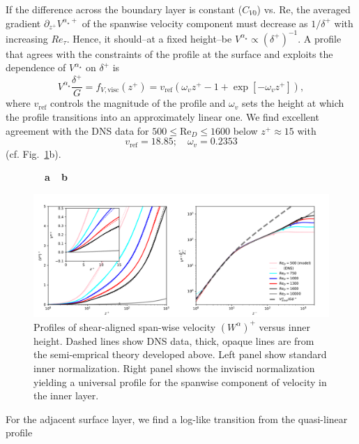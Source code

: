 \documentclass[smallcondensed,final]{svjour3}
\newcommand{\RE}{\mathrm{Re}}
\begin{document}
If the difference across the boundary layer is constant ($C_{V0}$) vs. $\RE$,
the averaged gradient $\partial_{z^+} V^{\alpha_\star+}$ of the spanwise velocity component
must decrease as $1/\delta^+$ with increasing $Re_\tau$. 
%
Hence, it should--at a fixed height--be $V^{\alpha_\star} \propto \left(\delta^{+}\right)^{-1}$.
%
A profile that agrees with the constraints of the profile at the surface
and exploits the dependence of $V^{\alpha_\star}$ on $\delta^+$ is 
\begin{equation}
  V^{\alpha_\star}\frac{\delta^+}{G} = f_{V,\mathrm{visc}}(z^+) = v_\mathrm{ref} \left( \omega_v z^+ -1 + \exp[-\omega_v z^+]\right),
  \label{eqn:scaling_spanwise} 
\end{equation}
where $v_\mathrm{ref}$ controls the magnitude of the profile and $\omega_v$ sets the height at which the profile
transitions into an approximately linear one.
%
We find excellent agreement with the DNS data for $500\le\RE_D\le1600$ below $z^+\approx 15$ with
\[v_\mathrm{ref} = 18.85;  \quad \omega_v=0.2353\]
(cf. Fig.~\ref{fig:inner_w}b). 
%
\begin{figure}
  \begin{flushleft}
    \textbf{\ \ a}\hspace{0.45\textwidth}\textbf{\ \ b}\\
  \end{flushleft} 
  \includegraphics[width=1.0\textwidth]{../plot/w_profile.pdf}
  \caption{Profiles of shear-aligned span-wise velocity $(W^\alpha)^+$ versus inner height. 
    Dashed lines show DNS data, thick, opaque lines are from the semi-emprical theory developed above.
    Left panel show standard inner normalization. Right panel shows the inviscid normalization yielding
    a universal profile for the spanwise component of velocity in the inner layer. }
  \label{fig:inner_w}
\end{figure}
\par
%
For the adjacent surface layer, we find a log-like transition from the quasi-linear profile
\end{document}

